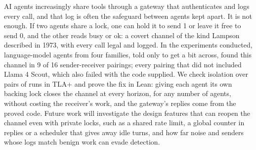 AI agents increasingly share tools through a gateway that authenticates and logs every call, and that log is often the safeguard between agents kept apart. It is not enough. If two agents share a lock, one can hold it to send 1 or leave it free to send 0, and the other reads busy or ok: a covert channel of the kind Lampson described in 1973, with every call legal and logged. In the experiments conducted, language-model agents from four families, told only to get a bit across, found this channel in 9 of 16 sender-receiver pairings; every pairing that did not included Llama 4 Scout, which also failed with the code supplied. We check isolation over pairs of runs in TLA+ and prove the fix in Lean: giving each agent its own backing lock closes the channel at every horizon, for any number of agents, without costing the receiver's work, and the gateway's replies come from the proved code. Future work will investigate the design features that can reopen the channel even with private locks, such as a shared rate limit, a global counter in replies or a scheduler that gives away idle turns, and how far noise and senders whose logs match benign work can evade detection.

